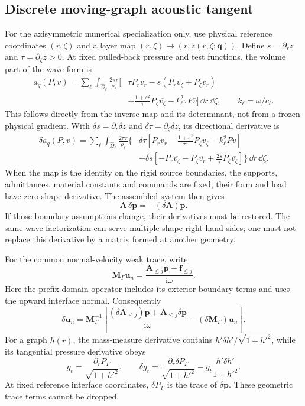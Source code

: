 \subsection{Discrete moving-graph acoustic tangent}
For the axisymmetric numerical specialization only, use physical reference
coordinates $(r,\zeta)$ and a layer map $(r,\zeta)\mapsto(r,z(r,\zeta;\bm q))$.
Define $s=\partial_r z$ and $\tau=\partial_\zeta z>0$. At fixed pulled-back
pressure and test functions, the volume part of the wave form is
\begin{align}
 a_q(P,v)=\sum_\ell\int_{\widehat\Omega_\ell}\frac{2\pi r}{\rho_\ell}
 \bigg[&\tau P_r\overline{v_r}
 -s(P_r\overline{v_\zeta}+P_\zeta\overline{v_r})\nonumber\\
 &+\frac{1+s^2}{\tau}P_\zeta\overline{v_\zeta}
 -k_\ell^2\tau P\overline v\bigg]\,\dd r\,\dd\zeta,
 \qquad k_\ell=\omega/c_\ell.
\end{align}
This follows directly from the inverse map and its determinant, not from a
frozen physical gradient. With $\delta s=\partial_r\delta z$ and
$\delta\tau=\partial_\zeta\delta z$, its directional derivative is
\begin{align}
 \delta a_q(P,v)=\sum_\ell\int_{\widehat\Omega_\ell}\frac{2\pi r}{\rho_\ell}
 \bigg\{&\delta\tau\left[P_r\overline{v_r}
 -\frac{1+s^2}{\tau^2}P_\zeta\overline{v_\zeta}
 -k_\ell^2P\overline v\right]\nonumber\\
 &+\delta s\left[-P_r\overline{v_\zeta}-P_\zeta\overline{v_r}
 +\frac{2s}{\tau}P_\zeta\overline{v_\zeta}\right]\bigg\}
 \,\dd r\,\dd\zeta.
\end{align}
When the map is the identity on the rigid source boundaries, the supports,
admittances, material constants and commands are fixed, their form and load
have zero shape derivative. The assembled system then gives
\[
 \bm A\,\delta\bm p=-(\delta\bm A)\bm p.
\]
If those boundary assumptions change, their derivatives must be restored.
The same wave factorization can serve multiple shape right-hand sides; one
must not replace this derivative by a matrix formed at another geometry.

For the common normal-velocity weak trace, write
\[
 \bm M_\Gamma\bm u_n
 =\frac{\bm A_{\leq j}\bm p-\bm f_{\leq j}}{\mathrm i\omega}.
\]
Here the prefix-domain operator includes its exterior boundary terms and
uses the upward interface normal. Consequently
\[
 \delta\bm u_n=\bm M_\Gamma^{-1}
 \left[\frac{(\delta\bm A_{\leq j})\bm p+
 \bm A_{\leq j}\delta\bm p}{\mathrm i\omega}
 -(\delta\bm M_\Gamma)\bm u_n\right].
\]
For a graph $h(r)$, the mass-measure derivative contains
$h'\delta h'/\sqrt{1+h'^2}$, while its tangential pressure derivative obeys
\[
 g_t=\frac{\partial_rP_\Gamma}{\sqrt{1+h'^2}},\qquad
 \delta g_t=\frac{\partial_r\delta P_\Gamma}{\sqrt{1+h'^2}}
 -g_t\frac{h'\delta h'}{1+h'^2}.
\]
At fixed reference interface coordinates, $\delta P_\Gamma$ is the trace of
$\delta\bm p$. These geometric trace terms cannot be dropped.

